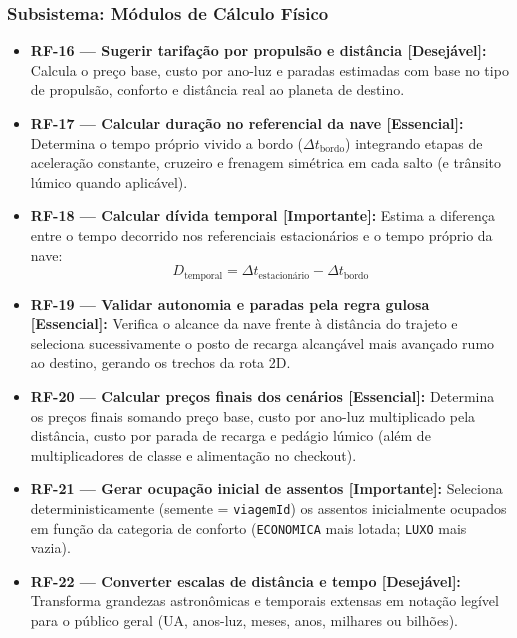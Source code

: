 \documentclass[12pt, a4paper]{article}
\begin{document}
\subsubsection{Subsistema: Módulos de Cálculo Físico}
\begin{itemize}
    \item \textbf{RF-16 --- Sugerir tarifação por propulsão e distância [Desejável]:} Calcula o preço base, custo por ano-luz e paradas estimadas com base no tipo de propulsão, conforto e distância real ao planeta de destino.
    \item \textbf{RF-17 --- Calcular duração no referencial da nave [Essencial]:} Determina o tempo próprio vivido a bordo ($\Delta t_{\text{bordo}}$) integrando etapas de aceleração constante, cruzeiro e frenagem simétrica em cada salto (e trânsito lúmico quando aplicável).
    \item \textbf{RF-18 --- Calcular dívida temporal [Importante]:} Estima a diferença entre o tempo decorrido nos referenciais estacionários e o tempo próprio da nave:
    \begin{equation}
        D_{\text{temporal}} = \Delta t_{\text{estacionário}} - \Delta t_{\text{bordo}}
    \end{equation}
    \item \textbf{RF-19 --- Validar autonomia e paradas pela regra gulosa [Essencial]:} Verifica o alcance da nave frente à distância do trajeto e seleciona sucessivamente o posto de recarga alcançável mais avançado rumo ao destino, gerando os trechos da rota 2D.
    \item \textbf{RF-20 --- Calcular preços finais dos cenários [Essencial]:} Determina os preços finais somando preço base, custo por ano-luz multiplicado pela distância, custo por parada de recarga e pedágio lúmico (além de multiplicadores de classe e alimentação no checkout).
    \item \textbf{RF-21 --- Gerar ocupação inicial de assentos [Importante]:} Seleciona deterministicamente (semente = \texttt{viagemId}) os assentos inicialmente ocupados em função da categoria de conforto (\texttt{ECONOMICA} mais lotada; \texttt{LUXO} mais vazia).
    \item \textbf{RF-22 --- Converter escalas de distância e tempo [Desejável]:} Transforma grandezas astronômicas e temporais extensas em notação legível para o público geral (UA, anos-luz, meses, anos, milhares ou bilhões).
\end{itemize}
\end{document}
